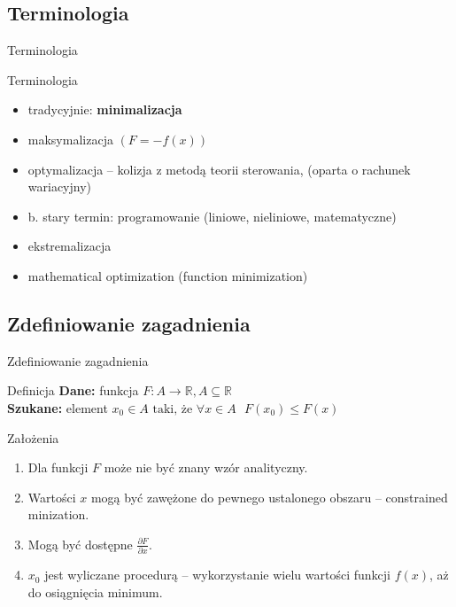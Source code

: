 \subsection{Terminologia}

  \begin{frame}{Terminologia}
    \begin{block}{Terminologia}
      \begin{itemize}
        \item tradycyjnie: \textbf{minimalizacja}
        \item maksymalizacja $(F = -f(x))$
        \item optymalizacja -- kolizja z metodą teorii
        sterowania, (oparta o rachunek wariacyjny)
        \item b. stary termin: programowanie (liniowe,
        nieliniowe, matematyczne)
        \item ekstremalizacja
        \item mathematical optimization (function minimization)
      \end{itemize}
    \end{block}
  \end{frame}

\subsection{Zdefiniowanie zagadnienia}

  \begin{frame}{Zdefiniowanie zagadnienia}
    \begin{block}{Definicja}
      \textbf{Dane:} funkcja $F: A \rightarrow \mathbb{R}, A \subseteq \mathbb{R} $ \\
      \textbf{Szukane:} element $ x_{0} \in A \text{ taki, że } \forall x \in A \text{ } F(x_{0}) \le F(x) $
    \end{block}

    \begin{block}{Założenia}
      \begin{enumerate}
        \item Dla funkcji $ F $ może nie być znany wzór analityczny.
        \item Wartości $ x $ mogą być zawężone do pewnego
        ustalonego obszaru -- constrained minization.
        \item Mogą być dostępne $ \frac{\partial F}{\partial x} $.
        \item $ x_0 $ jest wyliczane procedurą -- wykorzystanie wielu wartości funkcji $ f(x) $,
        aż do osiągnięcia minimum.
      \end{enumerate}
    \end{block}
  \end{frame}


